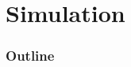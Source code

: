 \documentclass[color=usenames,dvipsnames]{beamer}\usepackage[]{graphicx}\usepackage[]{xcolor}
\begin{document}








\section{Simulation}


\begin{frame}
  \frametitle{Outline}
  \Large
  \tableofcontents[currentsection]
\end{frame}




\end{document}
